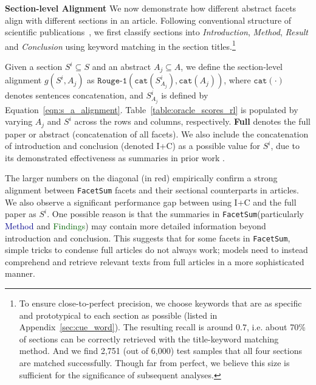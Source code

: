 \documentclass[11pt,a4paper]{article}
\newcommand{\ours}{\texttt{FacetSum}\xspace}
\newcommand{\absm}{\textcolor{darkblue}{Method}\xspace}
\newcommand{\absf}{\textcolor{darkgreen}{Findings}\xspace}
\begin{document}
\noindent\textbf{Section-level Alignment}\quad
We now demonstrate how different abstract facets align with different sections in an article.
Following conventional structure of scientific publications~\cite{suppe1998structure,rosenfeldt2000write}, we first classify sections into \textit{Introduction}, \textit{Method}, \textit{Result} and \textit{Conclusion} using keyword matching in the section titles.\footnote{
To ensure close-to-perfect precision, we choose keywords that are as specific and prototypical to each section as possible (listed in Appendix~\ref{sec:cue_word}).
The resulting recall is around $0.7$, i.e. about 70\% of sections can be correctly retrieved with the title-keyword matching method. And we find 2,751 (out of 6,000) test samples that all four sections are matched successfully.
Though far from perfect, we believe this size is sufficient for the significance of subsequent analyses.}


Given a section $S^i\subseteq S$ and an abstract $A_j\subseteq A$, we define the section-level alignment $g(S^i,A_j)$ as $\texttt{Rouge-1}(\texttt{cat}(S^i_{A_j}),\texttt{cat}(A_j))$,
where $\texttt{cat}(\cdot)$ denotes sentences concatenation, and $S^i_{A_j}$ is defined by Equation~\eqref{eqn:s_a_alignment}.
Table~\ref{table:oracle_scores_rl} is populated by varying $A_j$ and $S^i$ across the rows and columns, respectively.
\textbf{Full} denotes the full paper or abstract (concatenation of all facets). 
We also include the concatenation of introduction and conclusion (denoted I+C) as a possible value for $S^i$, due to its demonstrated effectiveness as summaries in prior work \cite{cachola2020tldr}.

The larger numbers on the diagonal (in red) empirically confirm a strong alignment between \ours facets and their sectional counterparts in articles.
We also observe a significant performance gap between using I+C and the full paper as $S^i$.
One possible reason is that the summaries in \ours (particularly \absm and \absf) may contain more detailed information beyond introduction and conclusion.
This suggests that for some facets in \ours, simple tricks to condense full articles do not always work; models need to instead comprehend and retrieve relevant texts from full articles in a more sophisticated manner.
\end{document}
